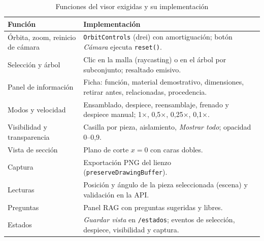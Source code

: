 \begin{table}[H]\centering\small
\caption{Funciones del visor exigidas y su implementación}\label{tab:sim-visor}
\begin{tabularx}{\linewidth}{@{}P{3.6cm} X@{}}\toprule
Función & Implementación\\\midrule
Órbita, zoom, reinicio de cámara & \texttt{OrbitControls} (drei) con amortiguación; botón \emph{Cámara} ejecuta \texttt{reset()}.\\
Selección y árbol & Clic en la malla (raycasting) o en el árbol por subconjunto; resaltado emisivo.\\
Panel de información & Ficha: función, material demostrativo, dimensiones, retirar antes, relacionadas, procedencia.\\
Modos y velocidad & Ensamblado, despiece, reensamblaje, frenado y despiece manual; 1×, 0,5×, 0,25×, 0,1×.\\
Visibilidad y transparencia & Casilla por pieza, aislamiento, \emph{Mostrar todo}; opacidad 0--0,9.\\
Vista de sección & Plano de corte $x = 0$ con caras dobles.\\
Captura & Exportación PNG del lienzo (\texttt{preserveDrawingBuffer}).\\
Lecturas & Posición y ángulo de la pieza seleccionada (escena) y validación en la API.\\
Preguntas & Panel RAG con preguntas sugeridas y libres.\\
Estados & \emph{Guardar vista} en \texttt{/estados}; eventos de selección, despiece, visibilidad y captura.\\\bottomrule
\end{tabularx}
\end{table}

